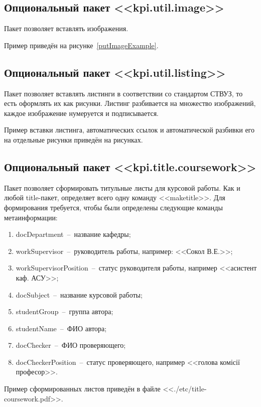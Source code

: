 \subsection{Опциональный пакет <<kpi.util.image>>}
	Пакет позволяет вставлять изображения.\par
	Пример приведён на рисунке~\ref{putImageExample}.
\subsection{Опциональный пакет <<kpi.util.listing>>}
	Пакет позволяет вставлять листинги в соответствии со стандартом СТВУЗ, то есть оформлять их как рисунки. Листинг разбивается на множество изображений, каждое изображение нумеруется и подписывается.\par
	Пример вставки листинга, автоматических ссылок и автоматической разбивки его на отдельные рисунки приведён на рисунках.
\subsection{Опциональный пакет <<kpi.title.coursework>>}
	Пакет позволяет сформировать титульные листы для курсовой работы. Как и любой title-пакет, определяет всего одну команду <<maketitle>>. Для формирования требуется, чтобы были определены следующие команды метаинформации: 
	\begin{enumerate}
	\item docDepartment~--~название кафедры;
	\item workSupervisor~--~руководитель работы, например: <<Сокол В.Е.>>;
	\item workSupervisorPosition~--~статус руководителя работы, например <<асистент каф. АСУ>>;
	\item docSubject~--~название курсовой работы;
	\item studentGroup~--~группа автора;
	\item studentName~--~ФИО автора;
	\item docChecker~--~ФИО проверяющего;
	\item docCheckerPosition~--~статус проверяющего, например <<голова комісії професор>>.	
	\end{enumerate}
	Пример сформированных листов приведён в файле <<./etc/title-coursework.pdf>>.
